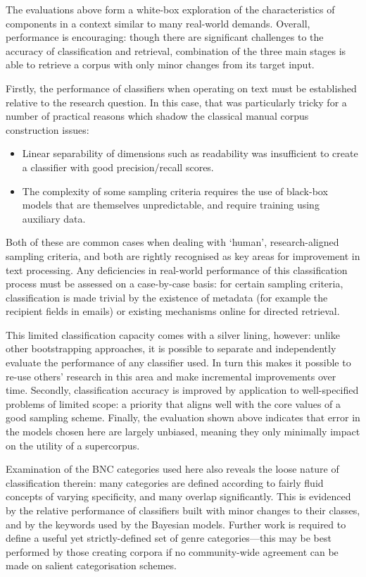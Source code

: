 



The evaluations above form a white-box exploration of the characteristics of components in a context similar to many real-world demands.  Overall, performance is encouraging: though there are significant challenges to the accuracy of classification and retrieval, combination of the three main stages is able to retrieve a corpus with only minor changes from its target input.

Firstly, the performance of classifiers when operating on text must be established relative to the research question.  In this case, that was particularly tricky for a number of practical reasons which shadow the classical manual corpus construction issues:

\begin{itemize}
    \item Linear separability of dimensions such as readability was insufficient to create a classifier with good precision/recall scores.
    \item The complexity of some sampling criteria requires the use of black-box models that are themselves unpredictable, and require training using auxiliary data.
\end{itemize}

Both of these are common cases when dealing with `human', research-aligned sampling criteria, and both are rightly recognised as key areas for improvement in text processing.  Any deficiencies in real-world performance of this classification process must be assessed on a case-by-case basis: for certain sampling criteria, classification is made trivial by the existence of metadata (for example the recipient fields in emails) or existing mechanisms online for directed retrieval.  

This limited classification capacity comes with a silver lining, however: unlike other bootstrapping approaches, it is possible to separate and independently evaluate the performance of any classifier used.  In turn this makes it possible to re-use others' research in this area and make incremental improvements over time.  Secondly, classification accuracy is improved by application to well-specified problems of limited scope: a priority that aligns well with the core values of a good sampling scheme.  Finally, the evaluation shown above indicates that error in the models chosen here are largely unbiased, meaning they only minimally impact on the utility of a supercorpus.


Examination of the BNC categories used here also reveals the loose nature of classification therein: many categories are defined according to fairly fluid concepts of varying specificity, and many overlap significantly.  This is evidenced by the relative performance of classifiers built with minor changes to their classes, and by the keywords used by the Bayesian models.  Further work is required to define a useful yet strictly-defined set of genre categories---this may be best performed by those creating corpora if no community-wide agreement can be made on salient categorisation schemes.


